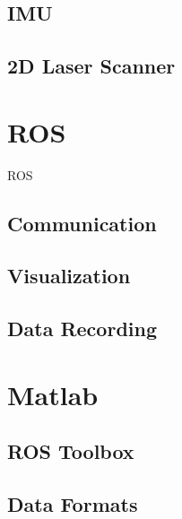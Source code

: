 	\subsection{IMU}

	\subsection{2D Laser Scanner}

\section{ROS}
	\ac{ROS}
\subsection{Communication}
\subsection{Visualization}
\subsection{Data Recording}

\section{Matlab}
\subsection{ROS Toolbox}
\subsection{Data Formats}

